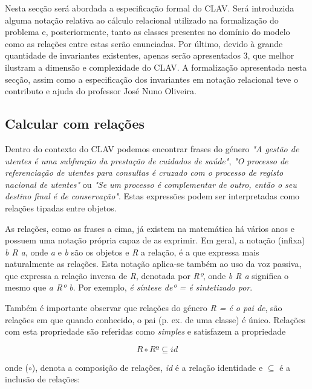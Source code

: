 \documentclass[tikz,runningheads,a4paper]{llncs}
\begin{document}
Nesta secção será abordada a especificação formal do CLAV. Será introduzida alguma notação relativa ao cálculo relacional utilizado na formalização do problema e, posteriormente, tanto as classes presentes no domínio do modelo como as relações entre estas serão enunciadas. Por último, devido à grande quantidade de invariantes existentes, apenas serão apresentados 3, que melhor ilustram a dimensão e complexidade do CLAV. A formalização apresentada nesta secção, assim como a especificação dos invariantes em notação relacional teve o contributo e ajuda do professor José Nuno Oliveira.

\subsection{Calcular com relações\cite{jno}\cite{jno-5}}

Dentro do contexto do CLAV podemos encontrar frases do género \textit{"A gestão de utentes é uma subfunção da prestação de cuidados de saúde"}, \textit{"O processo de referenciação de utentes para consultas é cruzado com o processo de registo nacional de utentes"} ou \textit{"Se um processo é complementar de outro, então o seu destino final é de conservação"}. Estas expressões podem ser interpretadas como relações tipadas entre objetos.

As relações, como as frases a cima, já existem na matemática há vários anos e possuem uma notação própria capaz de as exprimir. Em geral, a notação (infixa) \textit{b R a}, onde \textit{a} e \textit{b} são os objetos e \textit{R} a relação, é a que expressa mais naturalmente as relações. Esta notação aplica-se também ao uso da voz passiva, que expressa a relação inversa de \textit{R}, denotada por \textit{Rº}, onde \textit{b R a} significa o mesmo que \textit{a Rº b}. Por exemplo, \textit{é síntese deº = é sintetizado por}.\label{rel_inv}

Também é importante observar que relações do género \textit{R = é o pai de}, são relações em que quando conhecido, o pai (p. ex. de uma classe) é único. Relações com esta propriedade são referidas como \textit{simples} e satisfazem a propriedade

\begin{equation}
\label{eq-simple}
R \circ Rº \subseteq id
\end{equation}

\noindent onde ($\circ$), denota a composição de relações, \textit{id} é a relação identidade e $\subseteq$ é a inclusão de relações:
\end{document}
